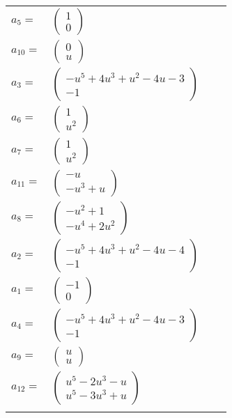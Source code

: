 \documentclass[1p]{elsarticle_modified}
\theoremstyle{definition}
\begin{document}
\begin{tabular}{m{7pt} m{180pt} m{7pt} m{180pt} }
\flushright $a_{5}=$&$\begin{pmatrix}1\\0\end{pmatrix}$ \\
\flushright $a_{10}=$&$\begin{pmatrix}0\\u\end{pmatrix}$ \\
\flushright $a_{3}=$&$\begin{pmatrix}- u^5+4 u^3+u^2-4 u-3\\-1\end{pmatrix}$ \\
\flushright $a_{6}=$&$\begin{pmatrix}1\\u^2\end{pmatrix}$ \\
\flushright $a_{7}=$&$\begin{pmatrix}1\\u^2\end{pmatrix}$ \\
\flushright $a_{11}=$&$\begin{pmatrix}- u\\- u^3+u\end{pmatrix}$ \\
\flushright $a_{8}=$&$\begin{pmatrix}- u^2+1\\- u^4+2 u^2\end{pmatrix}$ \\
\flushright $a_{2}=$&$\begin{pmatrix}- u^5+4 u^3+u^2-4 u-4\\-1\end{pmatrix}$ \\
\flushright $a_{1}=$&$\begin{pmatrix}-1\\0\end{pmatrix}$ \\
\flushright $a_{4}=$&$\begin{pmatrix}- u^5+4 u^3+u^2-4 u-3\\-1\end{pmatrix}$ \\
\flushright $a_{9}=$&$\begin{pmatrix}u\\u\end{pmatrix}$ \\
\flushright $a_{12}=$&$\begin{pmatrix}u^5-2 u^3- u\\u^5-3 u^3+u\end{pmatrix}$\\&\end{tabular}
\end{document}
